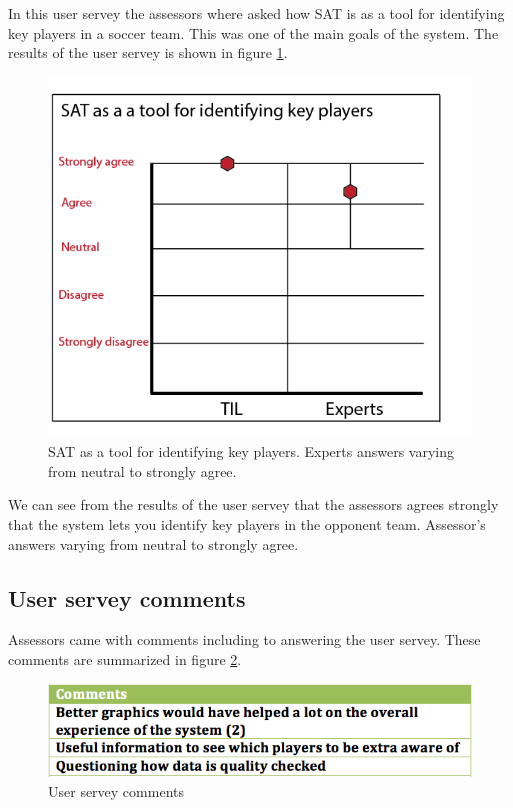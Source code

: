 In this user servey the assessors where asked how SAT is as a tool for identifying key players in a soccer team. This was one of the main goals of the system. The results of the user servey is shown in figure \ref{fig:user_servery2}. 

\begin{figure}[ht!]
\centering
\includegraphics[width=1\textwidth]{images/evaluation/user_servery2}
\caption{SAT as a tool for identifying key players. Experts answers varying from neutral to strongly agree.}
\label{fig:user_servery2}
\end{figure}

We can see from the results of the user servey that the assessors agrees strongly that the system lets you identify key players in the opponent team. Assessor’s answers varying from neutral to strongly agree.

\subsection{User servey comments}
Assessors came with comments including to answering the user servey. These comments are summarized in figure \ref{fig:comments}.

\begin{figure}[ht!]
\centering
\includegraphics[width=1\textwidth]{images/evaluation/comments}
\caption{User servey comments}
\label{fig:comments}
\end{figure}


